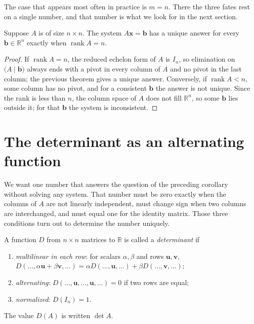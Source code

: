 The case that appears most often in practice is $m=n$. There the three fates rest on a single
number, and that number is what we look for in the next section.

\begin{akibat}
Suppose $A$ is of size $n\times n$. The system $A\mathbf{x}=\mathbf{b}$ has a unique answer for
every $\mathbf{b}\in\mathbb{R}^{n}$ exactly when $\operatorname{rank}A=n$.
\end{akibat}

\begin{proof}
If $\operatorname{rank}A=n$, the reduced echelon form of $A$ is $I_{n}$, so elimination on
$\bigl(A\mid\mathbf{b}\bigr)$ always ends with a pivot in every column of $A$ and no pivot in
the last column; the previous theorem gives a unique answer. Conversely, if
$\operatorname{rank}A<n$, some column has no pivot, and for a consistent $\mathbf{b}$ the answer
is not unique. Since the rank is less than $n$, the column space of $A$ does not fill
$\mathbb{R}^{n}$, so some $\mathbf{b}$ lies outside it; for that $\mathbf{b}$ the system is
inconsistent.
\end{proof}

\section{The determinant as an alternating function}

We want one number that answers the question of the preceding corollary without solving any
system. That number must be zero exactly when the columns of $A$ are not linearly independent,
must change sign when two columns are interchanged, and must equal one for the identity matrix.
Those three conditions turn out to determine the number uniquely.


\begin{definisi}[Determinant]
A function $D$ from $n\times n$ matrices to $\mathbb{R}$ is called a \emph{determinant} if
\begin{enumerate}
  \item \emph{multilinear in each row}: for scalars $\alpha,\beta$ and rows
        $\mathbf{u},\mathbf{v}$,
        $D(\dots,\alpha\mathbf{u}+\beta\mathbf{v},\dots)
         =\alpha D(\dots,\mathbf{u},\dots)+\beta D(\dots,\mathbf{v},\dots)$;
  \item \emph{alternating}: $D(\dots,\mathbf{u},\dots,\mathbf{u},\dots)=0$ if two rows are
        equal;
  \item \emph{normalized}: $D(I_{n})=1$.
\end{enumerate}
The value $D(A)$ is written $\det A$.
\end{definisi}

